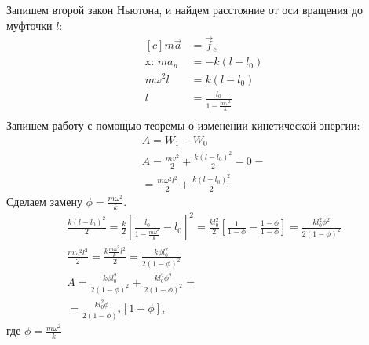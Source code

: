 \documentclass[a5paper,10pt]{article}
\begin{document}
\begin{figure}[H]
\vspace{-1em}
\end{figure}
Запишем второй закон Ньютона, и найдем расстояние от оси вращения до муфточки $l$: 
\begin{equation*}
	\begin{aligned}[c]
        m\vec{a}&=\vec{f}_e\\
        \text{x: } ma_n&=-k(l-l_0)\\
        m\omega^2l&=k(l-l_0)\\
        l&=\frac{l_0}{1-\frac{m\omega^2}{k}}\\
	\end{aligned}
\end{equation*}
Запишем работу с помощью теоремы о изменении кинетической энергии:
\begin{gather*}
        A=W_1-W_0\\
        A=\frac{mv^2}{2}+\frac{k(l-l_0)^2}{2}-0=\\
        =\frac{m\omega^2l^2}{2}+\frac{k(l-l_0)^2}{2}
\end{gather*}
Сделаем замену $\phi=\frac{m\omega^2}{k}$.
\begin{gather*}
\frac{k(l-l_0)^2}{2}=\frac{k}{2}\left[
    \frac{l_0}{1-\frac{m\omega^2}{k}}-l_0
\right]^2=\frac{kl_0^2}{2}\left[\frac{1}{1-\phi}-\frac{1-\phi}{1-\phi}\right]=\frac{kl_0^2\phi^2}{2({1-\phi})^2}\\
\frac{m\omega^2l^2}{2}=\frac{k\frac{m\omega^2}{k}l^2}{2}=
\frac{k\phi l_0^2}{2(1-\phi)^2}\\
    A=\frac{k\phi{}l_0^2}{2(1-\phi)^2}+
    \frac{kl_0^2\phi^2}{2(1-\phi)^2}=\\
    =\frac{kl_0^2\phi}{2(1-\phi)^2}\left[1+\phi\right],
\end{gather*}
где $\phi=\frac{m\omega^2}{k}$
\end{document}
